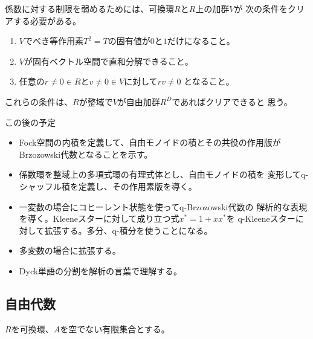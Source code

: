 {	\begin{note}[係数に対する制限]\label{note:係数に対する制限} %
		係数に対する制限を弱めるためには、可換環$R$と$R$上の加群$V$が
		次の条件をクリアする必要がある。
		\begin{enumerate}\setlength{\itemsep}{-1mm} %
			\item $V$でべき等作用素$T^2=T$の固有値が$0$と$1$だけになること。
			\item $V$が固有ベクトル空間で直和分解できること。
			\item 任意の$r\neq0\in R$と$v\neq0\in V$に対して$rv\neq0$
			となること。
		\end{enumerate} %
		これらの条件は、$R$が整域で$V$が自由加群$R^D$であればクリアできると
		思う。
	\end{note} %

	\begin{todo}[この後の展開]\label{todo:この後の展開} %
		この後の予定
		\begin{itemize}\setlength{\itemsep}{-1mm} %
			\item Fock空間の内積を定義して、自由モノイドの積とその共役の作用版が
			Brzozowski代数となることを示す。
			\item 係数環を整域上の多項式環の有理式体とし、自由モノイドの積を
			変形してq-シャッフル積を定義し、その作用素版を導く。
			\item 一変数の場合にコヒーレント状態を使ってq-Brzozowski代数の
			解析的な表現を導く。Kleeneスターに対して成り立つ式$x^*=1+xx^*$を
			q-Kleeneスターに対して拡張する。多分、q-積分を使うことになる。
			\item 多変数の場合に拡張する。
			\item Dyck単語の分割を解析の言葉で理解する。
		\end{itemize} %
	\end{todo} %
\subsection{自由代数}\label{s2:自由代数} %
	$R$を可換環、$A$を空でない有限集合とする。

}

